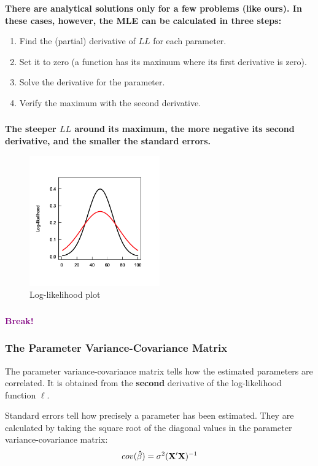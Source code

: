 \documentclass{beamer}
\begin{document}
\begin{frame}
    \frametitle{}
    \textbf{There are analytical solutions only for a few problems (like ours). In these cases, however, the MLE can be calculated in three steps:}
    \begin{enumerate}
        \item Find the (partial) derivative of $LL$ for each parameter.
        \item Set it to zero (a function has its maximum where its first derivative is zero).
        \item Solve the derivative for the parameter.
        \item Verify the maximum with the second derivative.
    \end{enumerate}
\end{frame}

\begin{frame}
    \frametitle{}
    \textbf{The steeper $LL$ around its maximum, the more negative its second derivative, and the smaller the standard errors.}
    
    \begin{figure}[h]
        \centering
        \includegraphics[width=0.5\textwidth]{lectures/day_2_LM_refresh_I/figures/unnamed-chunk-19-1.png} 
        \caption{Log-likelihood plot}
    \end{figure}
\end{frame}

\begin{frame}
    \frametitle{}
    \begin{center}
        \huge\textbf{\textcolor{purple}{Break!}}
    \end{center}
\end{frame}

\begin{frame}
    \frametitle{The Parameter Variance-Covariance Matrix}
    The parameter variance-covariance matrix tells how the estimated parameters are correlated. It is obtained from the \textbf{second} derivative of the log-likelihood function $\ell$.

    \vspace{0.5cm}
    Standard errors tell how precisely a parameter has been estimated. They are calculated by taking the square root of the diagonal values in the parameter variance-covariance matrix:
    \begin{equation*}
        \scriptsize{cov(\mathbf{\hat{\beta}})=\sigma^2 (\mathbf{X}' \mathbf{X})^{-1}}
    \end{equation*}
\end{frame}
\end{document}
